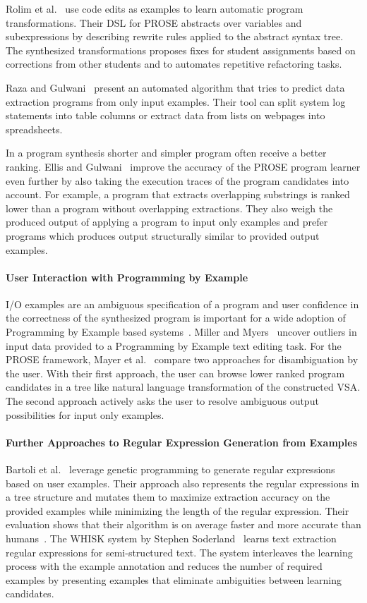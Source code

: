 \documentclass[\myrootdir/main.tex]{subfiles}
\begin{document}
Rolim et al.~\cite{rolim2017learning} use code edits as examples to learn automatic program transformations.
Their DSL for PROSE abstracts over variables and subexpressions by describing rewrite rules applied to the abstract syntax tree.
The synthesized transformations proposes fixes for student assignments based on corrections from other students and to automates repetitive refactoring tasks.

Raza and Gulwani~\cite{raza2017automated} present an automated algorithm that tries to predict data extraction programs from only input examples.
Their tool can split system log statements into table columns or extract data from lists on webpages into spreadsheets.

In a program synthesis shorter and simpler program often receive a better ranking.
Ellis and Gulwani~\cite{ellis2017learning} improve the accuracy of the PROSE program learner even further by also taking the execution traces of the program candidates into account.
For example, a program that extracts overlapping substrings is ranked lower than a program without overlapping extractions.
They also weigh the produced output of applying a program to input only examples and prefer programs which produces output structurally similar to provided output examples.

\paragraph{User Interaction with Programming by Example}
I/O examples are an ambiguous specification of a program and user confidence in the correctness of the synthesized program is important for a wide adoption of Programming by Example based systems~\cite{lau2009why-programming-by-demonstration}.
Miller and Myers~\cite{miller2001outlier} uncover outliers in input data provided to a Programming by Example text editing task.
For the PROSE framework, Mayer et al.~\cite{mayer2015user} compare two approaches for disambiguation by the user.
With their first approach, the user can browse lower ranked program candidates in a tree like natural language transformation of the constructed VSA\@.
The second approach actively asks the user to resolve ambiguous output possibilities for input only examples.


\paragraph{Further Approaches to Regular Expression Generation from Examples}
Bartoli et al.~\cite{bartoli2012automatic} leverage genetic programming to generate regular expressions based on user examples.
Their approach also represents the regular expressions in a tree structure and mutates them to maximize extraction accuracy on the provided examples while minimizing the length of the regular expression.
Their evaluation shows that their algorithm is on average faster and more accurate than humans~\cite{bartoli2016on-the-automatic}.
The WHISK system by Stephen Soderland~\cite{soderland1999learning} learns text extraction regular expressions for semi-structured text.
The system interleaves the learning process with the example annotation and reduces the number of required examples by presenting examples that eliminate ambiguities between learning candidates.
\end{document}
